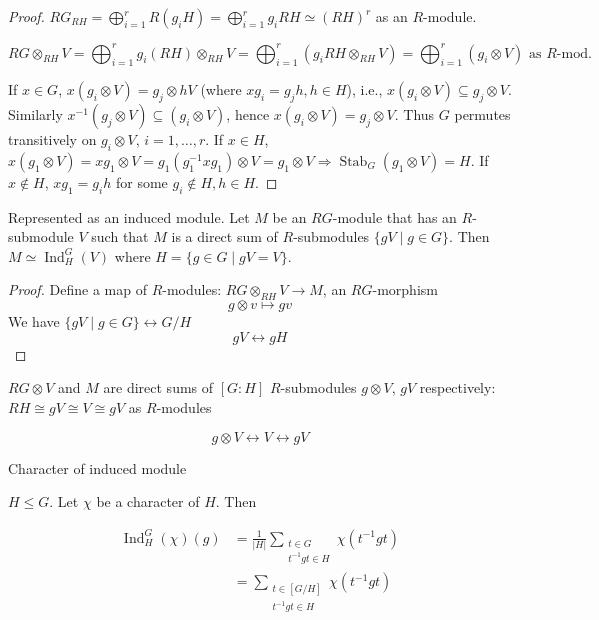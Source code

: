 \documentclass[11pt, a4paper]{report}
\begin{document}
\begin{proof}
$RG_{RH}=\bigoplus_{i=1}^{r} R(g_{i}H)=\bigoplus_{i=1}^{r} g_{i} RH \simeq (RH)^{r}$ as an $R$-module.

\[
RG \otimes_{RH} V=\bigoplus_{i=1}^{r} g_{i}(RH) \otimes_{RH} V=\bigoplus_{i=1}^{r}\left(g_{i} RH \otimes_{RH} V\right)=\bigoplus_{i=1}^{r}\left(g_{i} \otimes V\right) \text{ as } R\text{-mod.}
\]

If $x \in G$, $x(g_{i} \otimes V)=g_{j} \otimes hV$ (where $xg_{i}=g_{j}h, h \in H$),
i.e., $x(g_{i} \otimes V) \subseteq g_{j} \otimes V$. Similarly $x^{-1}(g_{j} \otimes V) \subseteq (g_{i} \otimes V)$, hence $x(g_{i} \otimes V)=g_{j} \otimes V$.
Thus $G$ permutes transitively on $g_{i} \otimes V$, $i=1, \dots, r$.
If $x \in H$, $x(g_{1} \otimes V)=xg_{1} \otimes V=g_{1}(g_{1}^{-1}xg_{1}) \otimes V=g_{1} \otimes V \Rightarrow \operatorname{Stab}_{G}(g_{1} \otimes V)=H$.
If $x \notin H$, $x g_{1}=g_{i} h$ for some $g_{i} \notin H, h \in H$.
\end{proof}

\begin{proposition}
Represented as an induced module.
Let $M$ be an $RG$-module that has an $R$-submodule $V$ such that $M$ is a direct sum of $R$-submodules $\{gV \mid g \in G\}$. Then $M \simeq \operatorname{Ind}_{H}^{G}(V)$ where $H=\{g \in G \mid gV=V\}$.
\end{proposition}

\begin{proof}
Define a map of $R$-modules: $RG \otimes_{RH} V \rightarrow M$, an $RG$-morphism
\[
g \otimes v \mapsto gv
\]
We have $\{gV \mid g \in G\} \longleftrightarrow G/H$
\[
gV \longleftrightarrow gH
\]
\end{proof}
$RG \otimes V$ and $M$ are direct sums of $[G:H]$ $R$-submodules $g \otimes V$, $gV$ respectively:
$RH \cong gV \cong V \cong gV$ as $R$-modules

\[
g \otimes V \leftrightarrow V \leftrightarrow gV
\]


\begin{proposition}
Character of induced module

$H \leqslant G$. Let $\chi$ be a character of $H$. Then

\[
\begin{aligned}
\operatorname{Ind}_{H}^{G}(\chi)(g) &= \frac{1}{|H|} \sum_{\substack{t \in G \\ t^{-1} g t \in H}} \chi\left(t^{-1} g t\right) \\
&= \sum_{\substack{t \in [G/H] \\ t^{-1} g t \in H}} \chi\left(t^{-1} g t\right)
\end{aligned}
\]

\end{proposition}
\end{document}
